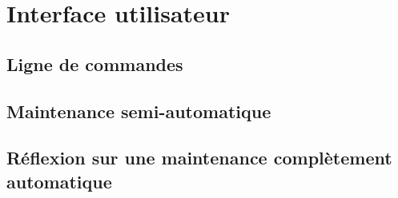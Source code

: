 
\chapter{Interface utilisateur}

\section{Ligne de commandes}

\section{Maintenance semi-automatique}

\section{Réflexion sur une maintenance complètement automatique}

